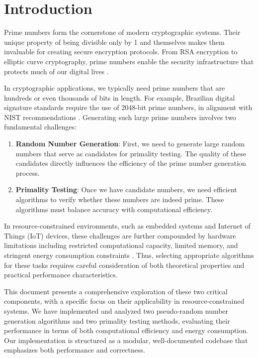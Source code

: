 \section{Introduction}

Prime numbers form the cornerstone of modern cryptographic systems. Their unique property of being divisible only by 1 and themselves makes them invaluable for creating secure encryption protocols. From RSA encryption to elliptic curve cryptography, prime numbers enable the security infrastructure that protects much of our digital lives \cite{rivest1978, crandall2005}.

In cryptographic applications, we typically need prime numbers that are hundreds or even thousands of bits in length. For example, Brazilian digital signature standards require the use of 2048-bit prime numbers, in alignment with NIST recommendations \cite{baillie_performance}. Generating such large prime numbers involves two fundamental challenges:

\begin{enumerate}
    \item \textbf{Random Number Generation}: First, we need to generate large random numbers that serve as candidates for primality testing. The quality of these candidates directly influences the efficiency of the prime number generation process.
    
    \item \textbf{Primality Testing}: Once we have candidate numbers, we need efficient algorithms to verify whether these numbers are indeed prime. These algorithms must balance accuracy with computational efficiency.
\end{enumerate}

In resource-constrained environments, such as embedded systems and Internet of Things (IoT) devices, these challenges are further compounded by hardware limitations including restricted computational capacity, limited memory, and stringent energy consumption constraints \cite{resource_constrained, prng_iot}. Thus, selecting appropriate algorithms for these tasks requires careful consideration of both theoretical properties and practical performance characteristics.

This document presents a comprehensive exploration of these two critical components, with a specific focus on their applicability in resource-constrained systems. We have implemented and analyzed two pseudo-random number generation algorithms and two primality testing methods, evaluating their performance in terms of both computational efficiency and energy consumption. Our implementation is structured as a modular, well-documented codebase that emphasizes both performance and correctness.

